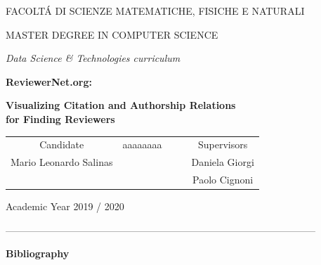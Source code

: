 \documentclass[11pt,a4paper,openright,oneside]{book}
\theoremstyle{definition}
\begin{document}
	\begin{Large}
		\begin{center}
			FACOLT\'A DI SCIENZE MATEMATICHE, FISICHE E NATURALI
			\vspace{1.5cm}


			MASTER DEGREE IN COMPUTER SCIENCE
			
			\textit{Data Science \& Technologies curriculum}
			\vspace{2.5cm}


			\textbf{ReviewerNet.org:}


			\textbf{Visualizing Citation and Authorship Relations\\for Finding Reviewers}
			\vspace{1.5cm}
			\begin{table}[h!]
				\centering
				\label{my-label}
				\begin{tabular}{ccccc}
					Candidate              & {\color{white} aaaaaaaa} &  &  & Supervisors                 					\\Mario Leonardo Salinas &                                             &  &  						& Daniela Giorgi \\
				   &                                             &  &  &  Paolo Cignoni \\
				                           

				\end{tabular}
			\end{table}
		\end{center}
	\end{Large}
	\vspace{0.5cm}
	\begin{normalsize}
		\begin{center}
			Academic Year 2019 / 2020
		\end{center}
	\end{normalsize}	
\newpage
	\cleardoublepage
	\tableofcontents
	\begin{normalsize}
-----------------------------------------------------------------------------------------------
	\end{normalsize}
	\textbf{Bibliography}
	
\end{document}
